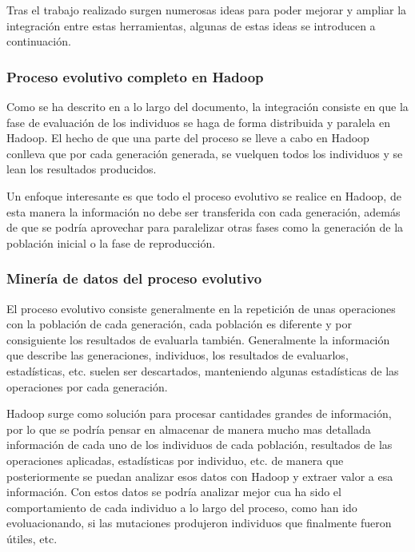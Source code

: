 Tras el trabajo realizado surgen numerosas ideas para poder mejorar y ampliar la integraci\'on entre estas herramientas, algunas de estas ideas se introducen a continuaci\'on.

\subsubsection{Proceso evolutivo completo en Hadoop}

Como se ha descrito en a lo largo del documento, la integraci\'on consiste en que la fase de evaluaci\'on de los individuos se haga de forma distribuida y paralela en Hadoop. El hecho de que una parte del proceso se lleve a cabo en Hadoop conlleva que por cada generaci\'on generada, se vuelquen todos los individuos y se lean los resultados producidos. 

Un enfoque interesante es que todo el proceso evolutivo se realice en Hadoop, de esta manera la informaci\'on no debe ser transferida con cada generaci\'on, adem\'as de que se podr\'ia aprovechar para paralelizar otras fases como la generaci\'on de la poblaci\'on inicial o la fase de reproducci\'on.

\subsubsection{Miner\'ia de datos del proceso evolutivo}

El proceso evolutivo consiste generalmente en la repetici\'on de unas operaciones con la poblaci\'on de cada generaci\'on, cada poblaci\'on es diferente y por consiguiente los resultados de evaluarla tambi\'en. Generalmente la informaci\'on que describe las generaciones, individuos, los resultados de evaluarlos, estad\'isticas, etc. suelen ser descartados, manteniendo algunas estad\'isticas de las operaciones por cada generaci\'on.

Hadoop surge como soluci\'on para procesar cantidades grandes de informaci\'on, por lo que se podr\'ia pensar en almacenar de manera mucho mas detallada informaci\'on de cada uno de los individuos de cada poblaci\'on, resultados de las operaciones aplicadas, estad\'isticas por individuo, etc. de manera que posteriormente se puedan analizar esos datos con Hadoop y extraer valor a esa informaci\'on. Con estos datos se podr\'ia analizar mejor cua ha sido el comportamiento de cada individuo a lo largo del proceso, como han ido evoluacionando, si las mutaciones produjeron individuos que finalmente fueron \'utiles, etc.

